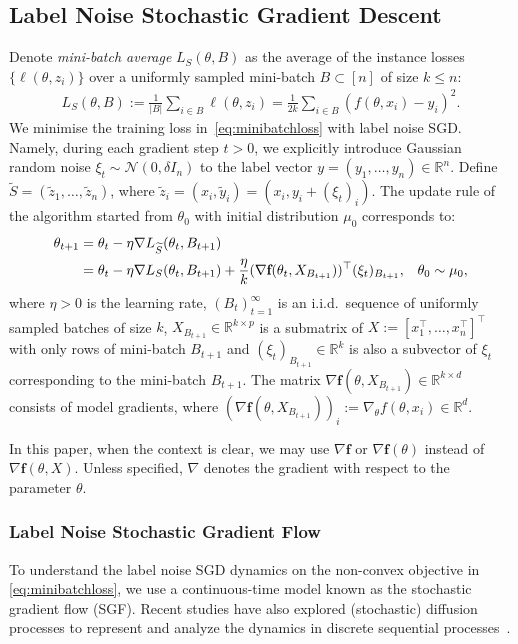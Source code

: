 \documentclass{article}
\begin{document}
\subsection{Label Noise Stochastic Gradient Descent}\label{sec:algorithm}
Denote \textit{mini-batch average} $L_S(\theta, B)$ as the average of the instance losses $\{\ell (\theta, z_i)\}$ over a uniformly sampled mini-batch $B \subset [n]$ of size $k \leq n$:
\begin{align}\label{eq:minibatchloss}
    \!\!\!L_S(\theta, B) \!:=\! \frac{1}{|B|} \sum_{i \in B} \ell (\theta, z_i) \!=\! \frac{1}{2k} \sum_{i \in B} (f(\theta,x_i) \!-\! y_i)^2.\!
\end{align}
We minimise the training loss in~\eqref{eq:minibatchloss} with {label noise} SGD. Namely, during each gradient step $t > 0$, we explicitly introduce Gaussian random noise $\xi_t \sim \mathcal{N}(0, \delta I_n)$ to the label vector $y = (y_1, \ldots, y_n) \in \mathbb{R}^n$. Define $\widetilde{S} = (\widetilde{z}_1, \ldots, \widetilde{z}_n)$, where $\widetilde{z}_i = (x_i, \widetilde{y}_i) = (x_i, y_i + (\xi_t)_i)$. The update rule of the algorithm started from $\theta_0$ with initial distribution $\mu_0$ corresponds to:
\begin{align} \label{eq:LNGD}
    \theta_{t+1} &= \theta_t - \eta \nabla L_{\widetilde{S}}(\theta_t, B_{t+1}) \notag\\
    &= \theta_t - \eta \nabla L_S(\theta_t, B_{t+1}) +  \frac{\eta}{k} (\nabla \textbf{f}(\theta_t, X_{B_{t+1}}))^\top (\xi_t)_{B_{t+1}}, &\theta_0 \sim \mu_0,
\end{align}
where $\eta >0$ is the learning rate, $(B_t)_{t=1}^{\infty}$ is an i.i.d.\ sequence of uniformly sampled batches of size $k$, $X_{B_{t+1}} \in \mathbb{R}^{k\times p}$ is a submatrix of $X := [x_1^\top, \ldots, x_n^\top]^\top$ with only rows of mini-batch $B_{t+1}$ and $(\xi_t)_{B_{t+1}} \in \mathbb{R}^k$ is also a subvector of $\xi_t$ corresponding to the mini-batch $B_{t+1}$. The matrix $\nabla \textbf{f}(\theta, X_{B_{t+1}}) \in \mathbb{R}^{k\times d}$ consists of model gradients, where $(\nabla \textbf{f}(\theta, X_{B_{t+1}}))_i := \nabla_\theta f(\theta, x_i) \in \mathbb{R}^d$.

In this paper, when the context is clear, we may use $\nabla \textbf{f}$ or $\nabla \textbf{f} (\theta)$ instead of $\nabla \textbf{f}(\theta,X)$. Unless specified, $\nabla$ denotes the gradient with respect to the parameter $\theta$.

\subsubsection{Label Noise Stochastic Gradient Flow}
To understand the label noise SGD dynamics on the non-convex objective in \eqref{eq:minibatchloss}, we use a continuous-time model known as the stochastic gradient flow (SGF). Recent studies have also explored (stochastic) diffusion processes to represent and analyze the dynamics in discrete sequential processes~\citep{Li_SDE, Farghly, Pillaud-Vivien}.
\end{document}
